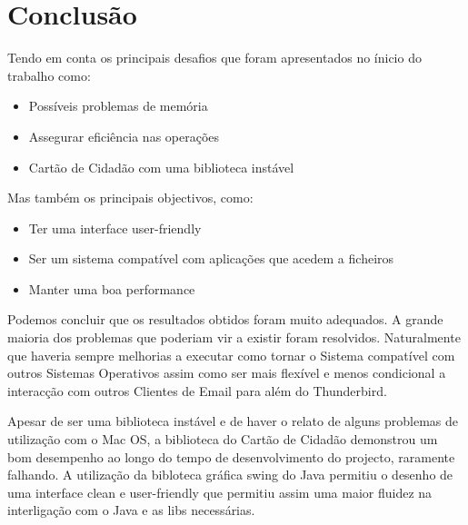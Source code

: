\chapter{Conclusão}
\label{chapter:conclusions}

Tendo em conta os principais desafios que foram apresentados no ínicio do trabalho como:
\begin{itemize}
\item Possíveis problemas de memória
\item Assegurar eficiência nas operações
\item Cartão de Cidadão com uma biblioteca instável
\end{itemize}
Mas também os principais objectivos, como:
\begin{itemize}
\item Ter uma interface user-friendly
\item Ser um sistema compatível com aplicações que acedem a ficheiros
\item Manter uma boa performance
\end{itemize}

Podemos concluir que os resultados obtidos foram muito adequados.
A grande maioria dos problemas que poderiam vir a existir foram resolvidos. Naturalmente que haveria sempre melhorias a executar como tornar o Sistema compatível com outros Sistemas Operativos assim como ser mais flexível e menos condicional a interacção com outros Clientes de Email para além do Thunderbird.

Apesar de ser uma biblioteca instável e de haver o relato de alguns problemas de utilização com o Mac OS, a biblioteca do Cartão de Cidadão demonstrou um bom desempenho ao longo do tempo de desenvolvimento do projecto, raramente falhando.
A utilização da bibloteca gráfica swing do Java permitiu o desenho de uma interface clean e user-friendly que permitiu assim uma maior fluidez na interligação com o Java e as libs necessárias.


